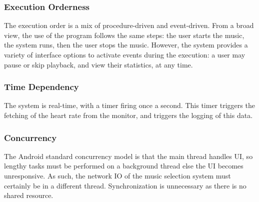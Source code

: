 \subsubsection{Execution Orderness}
The execution order is a mix of procedure-driven and event-driven. From a broad view, the use of the program follows the same steps: the user starts the music, the system runs, then the user stops the music. However, the system provides a variety of interface options to activate events during the execution: a user may pause or skip playback, and view their statistics, at any time.

\subsubsection{Time Dependency}
The system is real-time, with a timer firing once a second.
This timer triggers the fetching of the heart rate from the monitor, and triggers the logging of this data.

\subsubsection{Concurrency}
The Android standard concurrency model is that the main thread handles UI, so lengthy tasks must be performed on a background thread else the UI becomes unresponsive.
As such, the network IO of the music selection system must certainly be in a different thread.
Synchronization is unnecessary as there is no shared resource.
